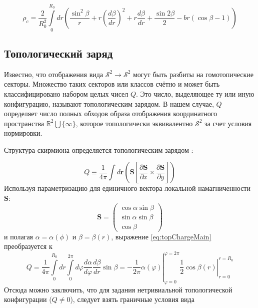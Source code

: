 \documentclass[a4paper,article,14pt]{extarticle}
\begin{document}
\begin{equation}
\label{eq:density}
{\rho _c} = \frac{2}{{R_0^2}}\int\limits_0^{{R_0}} {dr\left( {\frac{{{{\sin }^2}\beta }}{r} + r{{\left( {\frac{{d\beta }}{{dr}}} \right)}^2} + r\frac{{d\beta }}{{dr}} + \frac{{\sin 2\beta }}{2} - br\left( {\cos \beta  - 1} \right)} \right)}
\end{equation}

\subsection{Топологический заряд}

Известно\cite{rajaraman}, что отображения вида $\mathcal{S}^2 \rightarrow \mathcal{S}^2$ могут быть разбиты на гомотопические секторы. Множество таких секторов или классов счётно и может быть классифицировано набором целых чисел $Q$. Это число, выделяющее ту или иную конфигурацию, называют топологическим зарядом. В нашем случае, $Q$ определяет число полных обходов образа отображения координатного пространства $\mathbb{R}^2 \bigcup \{\infty\}$, которое топологически эквивалентно $\mathcal{S}^2$ за счет условия нормировки.

Структура скирмиона определяется топологическим зарядом \cite{rajaraman}:

\begin{equation}
\label{eq:topChargeMain}
Q \equiv \frac{1}{{4\pi }}\int {d{\mathbf{r}}\left( {{\mathbf{S}}\left[ {\frac{{\partial {\mathbf{S}}}}{{\partial x}} \times \frac{{\partial {\mathbf{S}}}}{{\partial y}}} \right]} \right)}
\end{equation}
Используя параметризацию для единичного вектора локальной намагниченности $\mathbf{S}$:
\begin{equation}
\label{eq:parametr}
\mathbf{S} = \left( {\begin{array}{*{20}{c}}
{\cos \alpha \sin \beta }\\
{\sin \alpha \sin \beta }\\
{\cos \beta }
\end{array}} \right)
\end{equation}
и полагая $\alpha = \alpha(\phi)$ и $\beta = \beta (r)$, выражение \eqref{eq:topChargeMain} преобразуется к
\begin{equation}
\label{eq:topChargeSimplify}
\left. {Q = \frac{1}{{4\pi }}\int\limits_0^{{R_0}} {dr\int\limits_0^{2\pi } {d\varphi } } \frac{{d\alpha }}{{d\varphi }}\frac{{d\beta }}{{dr}}\sin \beta  =  - \frac{1}{{2\pi }}\alpha \left( \varphi  \right)} \right|_{\varphi  = 0}^{\varphi  = 2\pi }\left. {\frac{1}{2}\cos \beta \left( r \right)} \right|_{r = 0}^{r = {R_0}}
\end{equation}
Отсюда можно заключить, что для задания нетривиальной топологической конфигурации ($Q \neq0$), следует взять граничные условия вида
\end{document}
